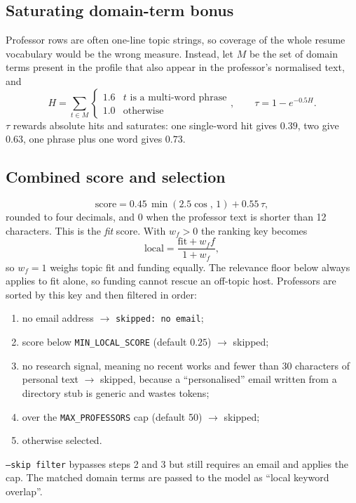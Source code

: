 \documentclass[11pt,a4paper]{article}
\newcommand{\code}[1]{\texttt{#1}}
\begin{document}
\subsection{Saturating domain-term bonus}
Professor rows are often one-line topic strings, so coverage of the whole resume vocabulary would
be the wrong measure. Instead, let $M$ be the set of domain terms present in the profile that also
appear in the professor's normalised text, and
\[
  H = \sum_{t \in M} \begin{cases} 1.6 & t \text{ is a multi-word phrase} \\ 1.0 & \text{otherwise}\end{cases},
  \qquad
  \tau = 1 - e^{-0.5 H}.
\]
$\tau$ rewards absolute hits and saturates: one single-word hit gives $0.39$, two give $0.63$,
one phrase plus one word gives $0.73$.

\subsection{Combined score and selection}
\[
  \text{score} = 0.45\,\min(2.5\cos,\, 1) + 0.55\,\tau ,
\]
rounded to four decimals, and $0$ when the professor text is shorter than 12 characters. This
is the \emph{fit} score. With $w_f > 0$ the ranking key becomes
\[
  \text{local} = \frac{\text{fit} + w_f f}{1 + w_f},
\]
so $w_f = 1$ weighs topic fit and funding equally. The relevance floor below always applies to
fit alone, so funding cannot rescue an off-topic host.
Professors are sorted by this key and then filtered in order:
\begin{enumerate}
  \item no email address $\to$ \code{skipped: no email};
  \item score below \code{MIN\_LOCAL\_SCORE} (default $0.25$) $\to$ skipped;
  \item no research signal, meaning no recent works and fewer than 30 characters of personal text
        $\to$ skipped, because a ``personalised'' email written from a directory stub is generic
        and wastes tokens;
  \item over the \code{MAX\_PROFESSORS} cap (default 50) $\to$ skipped;
  \item otherwise selected.
\end{enumerate}
\code{--skip filter} bypasses steps 2 and 3 but still requires an email and applies the cap.
The matched domain terms are passed to the model as ``local keyword overlap''.

\end{document}
